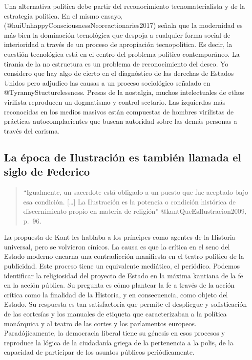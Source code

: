 \documentclass[
]{article}
\begin{document}
Una alternativa política debe partir del reconocimiento
tecnomaterialista y de la estrategia política. En el mismo ensayo,
(@huiUnhappyConsciousnessNeoreactionaries2017) señala que la modernidad
es más bien la dominación tecnológica que despoja a cualquier forma
social de interioridad a través de un proceso de apropiación
tecnopolítica. Es decir, la cuestión tecnológica está en el centro del
problema político contemporáneo. La tiranía de la no estructura es un
problema de reconocimiento del deseo. Yo considero que hay algo de
cierto en el diagnóstico de las derechas de Estados Unidos pero adjudico
las causas a un proceso sociológico señalado en
@TyrannyStucturelessness. Presas de la nostalgia, muchos intelectuales
de ethos virilista reproducen un dogmatismo y control sectario. Las
izquierdas más reconocidas en los medios masivos están compuestas de
hombres virilistas de prácticas autocomplacientes que buscan autoridad
sobre las demás personas a través del carisma.

\hypertarget{la-uxe9poca-de-ilustraciuxf3n-es-tambiuxe9n-llamada-el-siglo-de-federico}{%
\subsection{La época de Ilustración es también llamada el siglo de
Federico}\label{la-uxe9poca-de-ilustraciuxf3n-es-tambiuxe9n-llamada-el-siglo-de-federico}}

\begin{quote}
``Igualmente, un sacerdote está obligado a un puesto que fue aceptado
bajo esa condición. {[}\ldots{]} La Ilustración es la potencia o
condición histórica de discernimiento propio en materia de religión''
@kantQueEsIlustracion2009, p.~96.
\end{quote}

La propuesta de Kant les hablaba a los príncipes como agentes de la
Historia universal, pero se volvieron cínicos. La causa es que la
crítica en el seno del Estado moderno encarna una contradicción
manifiesta en el teatro político de la publicidad. Este proceso tiene un
equivalente mediático, el periódico. Podemos identificar la religiosidad
del proyecto de Estado en la máxima kantiana de la fe en la acción
pública. Su pregunta es cómo plantear la fe a través de la acción
crítica como la finalidad de la Historia, y en consecuencia, como objeto
del Estado. Su respuesta es tan satisfactoria que permite el despliegue
y sofisticación de las cortesías y los manuales de etiqueta que
caracterizaban a la política monárquica y al teatro de las cortes y los
parlamentos europeos. Paradójicamente, la democracia liberal tiene su
génesis en esos procesos y reproduce la lógica de la ciudadanía griega
de la pertenencia a la polis, de la capacidad de participar de los
asuntos públicos periódicamente.
\end{document}
